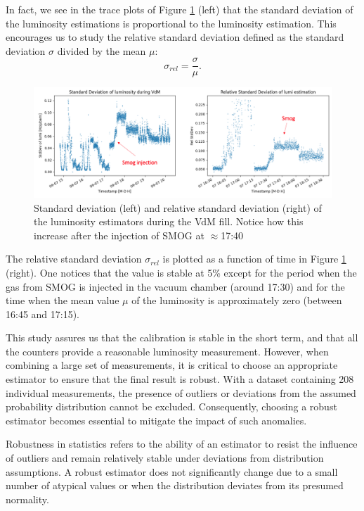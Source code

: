 In fact, we see in the trace plots of Figure \ref{fig:std_dev_rel_std} (left) that the standard deviation of the luminosity estimations is proportional to the luminosity estimation. This encourages us to study the relative standard deviation defined as the standard deviation $\sigma$  divided by the mean $\mu$:
\begin{equation}
    \sigma_{rel} = \frac{\sigma}{\mu} \label{rel_std}.
\end{equation}


\begin{figure}
    \centering
    \includegraphics[width=\textwidth]{figures/std_dev_and_rel_std.png}
    \caption{Standard deviation (left) and relative standard deviation (right) of the luminosity estimators during the VdM fill. Notice how this increase after the injection of SMOG at $\approx$17:40}
    \label{fig:std_dev_rel_std}
\end{figure}


The relative standard deviation $\sigma_{rel}$ is plotted as a function of time in Figure \ref{fig:std_dev_rel_std} (right). One notices that the value is stable at 5\% except for the period when the gas from SMOG is injected in the vacuum chamber (around 17:30) and for the time when the mean value $\mu$ of the luminosity is approximately zero (between 16:45 and 17:15).  

This study assures us that the calibration is stable in the short term, and that all the counters provide a reasonable luminosity measurement. However, when combining a large set of measurements, it is critical to choose an appropriate estimator to ensure that the final result is robust. With a dataset containing 208 individual measurements, the presence of outliers or deviations from the assumed probability distribution cannot be excluded. Consequently, choosing a robust estimator becomes essential to mitigate the impact of such anomalies.

Robustness in statistics refers to the ability of an estimator to resist the influence of outliers and remain relatively stable under deviations from distribution assumptions. A robust estimator does not significantly change due to a small number of atypical values or when the distribution deviates from its presumed normality.

